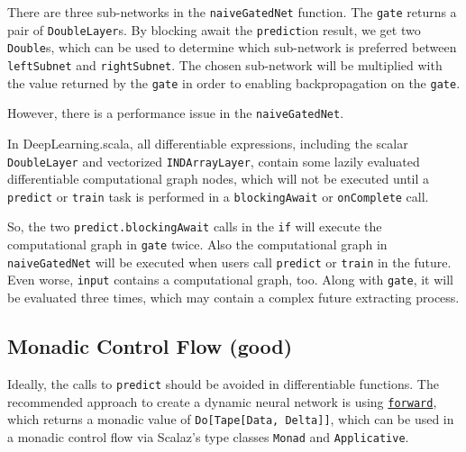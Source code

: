 There are three sub-networks in the \lstinline{naiveGatedNet} function. The \lstinline{gate} returns a pair of \lstinline{DoubleLayer}s. By blocking await the \lstinline{predict}ion result, we get two \lstinline{Double}s, which can be used to determine which sub-network is preferred between \lstinline{leftSubnet} and \lstinline{rightSubnet}. The chosen sub-network will be multiplied with the value returned by the \lstinline{gate} in order to enabling backpropagation on the \lstinline{gate}.

However, there is a performance issue in the \lstinline{naiveGatedNet}.

In DeepLearning.scala, all differentiable expressions, including the scalar \lstinline{DoubleLayer} and vectorized \lstinline{INDArrayLayer}, contain some lazily evaluated differentiable \gls{computational graph} nodes, which will not be executed until a \lstinline{predict} or \lstinline{train} task is performed in a \lstinline{blockingAwait} or \lstinline{onComplete} call.

So, the two \lstinline{predict.blockingAwait} calls in the \lstinline{if} will execute the \gls{computational graph} in \lstinline{gate} twice. Also the \gls{computational graph} in \lstinline{naiveGatedNet} will be executed when users call \lstinline{predict} or \lstinline{train} in the future. Even worse, \lstinline{input} contains a \gls{computational graph}, too. Along with \lstinline{gate}, it will be evaluated three times, which may contain a complex future extracting process.

\subsection{Monadic Control Flow (good)}
\label{monadic}

Ideally, the calls to \lstinline{predict} should be avoided in differentiable functions. The recommended approach to create a dynamic neural network is using \href{https://javadoc.io/page/com.thoughtworks.deeplearning/deeplearning_2.11/latest/com/thoughtworks/deeplearning/DeepLearning.html#forward(differentiable:Differentiable):com.thoughtworks.raii.asynchronous.Do[com.thoughtworks.deeplearning.DeepLearning.Tape[DeepLearning.this.Data,DeepLearning.this.Delta]]}{\lstinline{forward}}, which returns a monadic value of \lstinline{Do[Tape[Data, Delta]]}, which can be used in a monadic control flow via Scalaz\cite{kenji2017scalaz}'s type classes\cite{oliveira2010type} \lstinline{Monad} and \lstinline{Applicative}.

